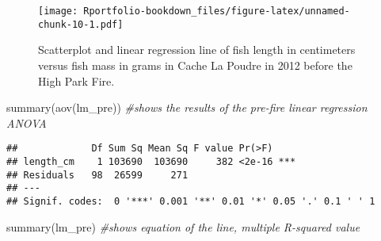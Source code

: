 \documentclass[
]{book}
\newenvironment{Shaded}{\begin{snugshade}}{\end{snugshade}}
\newcommand{\AttributeTok}[1]{\textcolor[rgb]{0.77,0.63,0.00}{#1}}
\newcommand{\CommentTok}[1]{\textcolor[rgb]{0.56,0.35,0.01}{\textit{#1}}}
\newcommand{\FunctionTok}[1]{\textcolor[rgb]{0.00,0.00,0.00}{#1}}
\newcommand{\NormalTok}[1]{#1}
\newcommand{\OtherTok}[1]{\textcolor[rgb]{0.56,0.35,0.01}{#1}}
\newcommand{\SpecialCharTok}[1]{\textcolor[rgb]{0.00,0.00,0.00}{#1}}
\newcommand{\StringTok}[1]{\textcolor[rgb]{0.31,0.60,0.02}{#1}}
\begin{document}
\begin{Shaded}
\end{Shaded}

\begin{figure}
\centering
\texttt{[image: Rportfolio-bookdown\_files/figure-latex/unnamed-chunk-10-1.pdf]}
\caption{\label{fig:unnamed-chunk-10}Scatterplot and linear regression line of fish length in centimeters versus fish mass in grams in Cache La Poudre in 2012 before the High Park Fire.}
\end{figure}

\begin{Shaded}
\begin{Highlighting}[]
\FunctionTok{summary}\NormalTok{(}\FunctionTok{aov}\NormalTok{(lm\_pre)) }\CommentTok{\#shows the results of the pre{-}fire linear regression ANOVA}
\end{Highlighting}
\end{Shaded}

\begin{verbatim}
##             Df Sum Sq Mean Sq F value Pr(>F)    
## length_cm    1 103690  103690     382 <2e-16 ***
## Residuals   98  26599     271                   
## ---
## Signif. codes:  0 '***' 0.001 '**' 0.01 '*' 0.05 '.' 0.1 ' ' 1
\end{verbatim}

\begin{Shaded}
\begin{Highlighting}[]
\FunctionTok{summary}\NormalTok{(lm\_pre) }\CommentTok{\#shows equation of the line, multiple R{-}squared value}
\end{Highlighting}
\end{Shaded}
\end{document}

